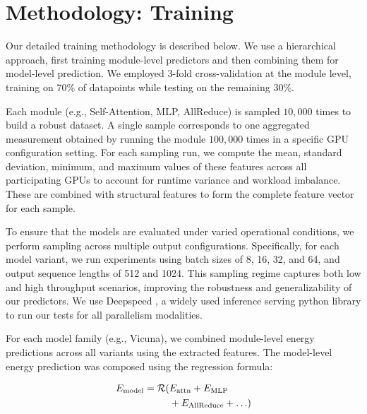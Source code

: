 \section{Methodology: Training }
\label{app:training_methodology}

Our detailed training methodology is described below. We use a hierarchical approach, first training module-level predictors and then combining them for model-level prediction. We employed 3-fold cross-validation at the module level, training on 70\% of datapoints while testing on the remaining 30\%. 

Each module (e.g., Self-Attention, MLP, AllReduce) is sampled $10{,}000$ times to build a robust dataset. A single sample corresponds to one aggregated measurement obtained by running the module $100{,}000$ times in a specific GPU configuration setting. For each sampling run, we compute the mean, standard deviation, minimum, and maximum values of these features across all participating GPUs to account for runtime variance and workload imbalance. These are combined with structural features to form the complete feature vector for each sample.

To ensure that the models are evaluated under varied operational conditions, we perform sampling across multiple output configurations. Specifically, for each model variant, we run experiments using batch sizes of 8, 16, 32, and 64, and output sequence lengths of 512 and 1024. This sampling regime captures both low and high throughput scenarios, improving the robustness and generalizability of our predictors. We use Deepspeed \citep{deepspeed}, a widely used inference serving python library to run our tests for all parallelism modalities.


For each model family (e.g., Vicuna), we combined module-level energy predictions across all variants using the extracted features. The model-level energy prediction was composed using the regression formula: 


\vspace{-9pt}
\setlength{\abovedisplayskip}{2pt}
\setlength{\belowdisplayskip}{2pt}
\begin{equation}
\begin{aligned}
E_{\text{model}} = \mathcal{R}(&E_{\text{attn}} + E_{\text{MLP}} \\
&+ E_{\text{AllReduce}} + \ldots)
\end{aligned}
\vspace{-6pt}
\end{equation}

